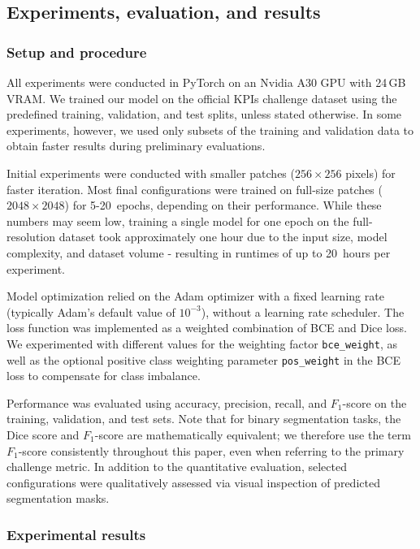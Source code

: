 \documentclass[12pt]{article}
\begin{document}
\subsection{Experiments, evaluation, and results}

\subsubsection{Setup and procedure}

All experiments were conducted in PyTorch on an Nvidia A30 GPU with 24\,GB VRAM. We trained our model on the official KPIs challenge dataset using the predefined training, validation, and test splits, unless stated otherwise. In some experiments, however, we used only subsets of the training and validation data to obtain faster results during preliminary evaluations.

Initial experiments were conducted with smaller patches ($256 \times 256$ pixels) for faster iteration. Most final configurations were trained on full-size patches ($2048 \times 2048$) for 5{-}20~epochs, depending on their performance. While these numbers may seem low, training a single model for one epoch on the full-resolution dataset took approximately one hour due to the input size, model complexity, and dataset volume - resulting in runtimes of up to 20~hours per experiment.

Model optimization relied on the Adam optimizer with a fixed learning rate (typically Adam’s default value of $10^{-3}$), without a learning rate scheduler. The loss function was implemented as a weighted combination of BCE and Dice loss. We experimented with different values for the weighting factor \texttt{bce\_weight}, as well as the optional positive class weighting parameter \texttt{pos\_weight} in the BCE loss to compensate for class imbalance.

Performance was evaluated using accuracy, precision, recall, and $F_1$-score on the training, validation, and test sets. Note that for binary segmentation tasks, the Dice score and $F_1$-score are mathematically equivalent; we therefore use the term $F_1$-score consistently throughout this paper, even when referring to the primary challenge metric. In addition to the quantitative evaluation, selected configurations were qualitatively assessed via visual inspection of predicted segmentation masks.

\subsubsection{Experimental results}
\end{document}
